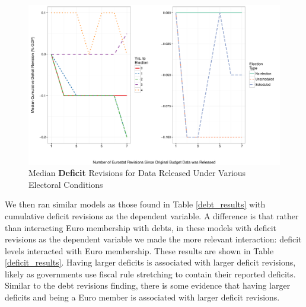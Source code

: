 \documentclass[]{article}
\begin{document}
\begin{figure}
    \begin{center}
        \caption{Median \textbf{Deficit} Revisions for Data Released Under Various Electoral Conditions}
        \label{median_deficit_revisions}
        \includegraphics[scale=0.55]{figures/median_deficit_revisions.pdf}
    \end{center}
\end{figure}


We then ran similar models as those found in Table \ref{debt_results} with cumulative deficit revisions as the dependent variable. A difference is that rather than interacting Euro membership with debts, in these models with deficit revisions as the dependent variable we made the more relevant interaction: deficit levels interacted with Euro membership. These results are shown in Table \ref{deficit_results}. Having larger deficits is associated with larger deficit revisions, likely as governments use fiscal rule stretching to contain their reported deficits.  Similar to the debt revisions finding, there is some evidence that having larger deficits and being a Euro member is associated with larger deficit revisions.

\begin{landscape}
    
\end{landscape}
\end{document}
